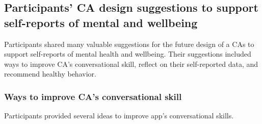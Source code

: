             




    
  
            




\subsection{Participants' \ac{CA} design suggestions to support self-reports of mental and wellbeing}
    Participants shared many valuable suggestions for the future design of a \acp{CA} to support self-reports of mental health and wellbeing. 
    Their suggestions included ways to
        improve \ac{CA}'s conversational skill,
        reflect on their self-reported data, and
        recommend healthy behavior.

    \subsubsection{Ways to improve \ac{CA}'s conversational skill}
        Participants provided several ideas to improve \acl{app}'s conversational skills.
        
